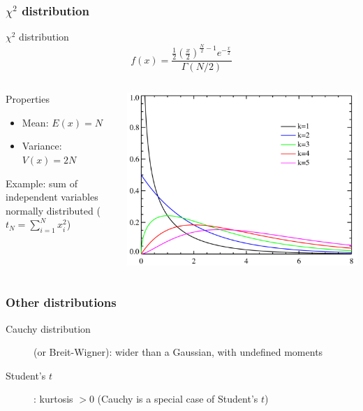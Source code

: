 \documentclass[9pt]{beamer}
\newif\ifmynote
\newcommand\mynote[1]{%
\ifmynote \textbf{#1} \else \fi
}
\begin{document}
\begin{frame}
 \frametitle{$\chi^2$ distribution}
 
 \mynote{Écrire au tableau}
 
 \begin{block}{$\chi^2$ distribution}
  $$f(x) = \frac{\frac{1}{2} \left( \frac{x}{2} \right)^{\frac{N}{2}-1} e^{-\frac{x}{2}}}{\Gamma(N/2)}$$
 \end{block}
  
 \begin{columns}
  \begin{column}{0.6\textwidth}
   
 \begin{block}{Properties}
  \begin{itemize}
   \item Mean: $E(x) = N$
   \item Variance: $V(x) = 2N$
  \end{itemize}
 \end{block}
 
 Example: sum of independent variables normally distributed ($t_N = \sum_{i=1}^{N} x_i^2$)
  \end{column}
  \begin{column}{0.4\textwidth}
   \includegraphics[width=\textwidth]{../figures/Chi-square_distributionPDF.png}
  \end{column}

 \end{columns}


\end{frame}


\begin{frame}
 \frametitle{Other distributions}
 
 \mynote{Écrire au tableau}
 
 \begin{description}
  \item[Cauchy distribution] (or Breit-Wigner): wider than a Gaussian, with undefined moments
  \item[Student's $t$]: kurtosis $>0$ (Cauchy is a special case of Student's $t$)
 \end{description}

\end{frame}
\end{document}
